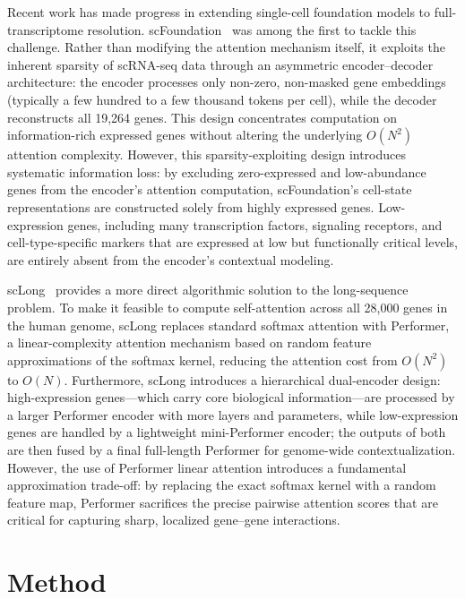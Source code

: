 \documentclass[11pt]{article}
\begin{document}
Recent work has made progress in extending single-cell foundation models to full-transcriptome resolution. scFoundation~\cite{hao2024scfoundation} was among the first to tackle this challenge. Rather than modifying the attention mechanism itself, it exploits the inherent sparsity of scRNA-seq data through an asymmetric encoder--decoder architecture: the encoder processes only non-zero, non-masked gene embeddings (typically a few hundred to a few thousand tokens per cell), while the decoder reconstructs all 19,264 genes. This design concentrates computation on information-rich expressed genes without altering the underlying \(O(N^2)\) attention complexity. However, this sparsity-exploiting design introduces systematic information loss: by excluding zero-expressed and low-abundance genes from the encoder's attention computation, scFoundation's cell-state representations are constructed solely from highly expressed genes. Low-expression genes, including many transcription factors, signaling receptors, and cell-type-specific markers that are expressed at low but functionally critical levels, are entirely absent from the encoder's contextual modeling.

scLong~\cite{bai2026sclong} provides a more direct algorithmic solution to the long-sequence problem. To make it feasible to compute self-attention across all 28,000 genes in the human genome, scLong replaces standard softmax attention with Performer, a linear-complexity attention mechanism based on random feature approximations of the softmax kernel, reducing the attention cost from \(O(N^2)\) to \(O(N)\). Furthermore, scLong introduces a hierarchical dual-encoder design: high-expression genes---which carry core biological information---are processed by a larger Performer encoder with more layers and parameters, while low-expression genes are handled by a lightweight mini-Performer encoder; the outputs of both are then fused by a final full-length Performer for genome-wide contextualization. However, the use of Performer linear attention introduces a fundamental approximation trade-off: by replacing the exact softmax kernel with a random feature map, Performer sacrifices the precise pairwise attention scores that are critical for capturing sharp, localized gene--gene interactions.

\section{Method}
\end{document}
